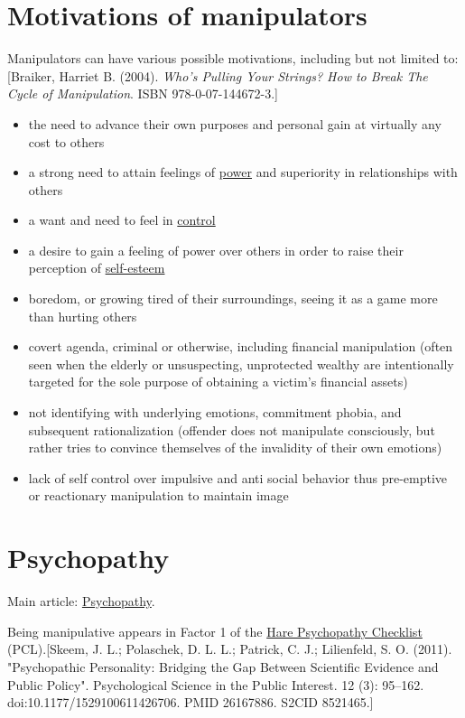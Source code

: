 \documentclass{book}
\numberwithin{equation}{section}
\begin{document}
\section{Motivations of manipulators}
Manipulators can have various possible motivations, including but not limited to:[Braiker, Harriet B. (2004). \textit{Who's Pulling Your Strings? How to Break The Cycle of Manipulation}. ISBN 978-0-07-144672-3.]
\begin{itemize}
    \item the need to advance their own purposes and personal gain at virtually any cost to others
    \item a strong need to attain feelings of \href{https://en.wikipedia.org/wiki/Abusive_power_and_control}{power} and superiority in relationships with others
    \item a want and need to feel in \href{https://en.wikipedia.org/wiki/Abusive_power_and_control}{control}
    \item a desire to gain a feeling of power over others in order to raise their perception of \href{https://en.wikipedia.org/wiki/Self-esteem}{self-esteem}
    \item boredom, or growing tired of their surroundings, seeing it as a game more than hurting others
    \item covert agenda, criminal or otherwise, including financial manipulation (often seen when the elderly or unsuspecting, unprotected wealthy are intentionally targeted for the sole purpose of obtaining a victim's financial assets)
    \item not identifying with underlying emotions, commitment phobia, and subsequent rationalization (offender does not manipulate consciously, but rather tries to convince themselves of the invalidity of their own emotions)
    \item lack of self control over impulsive and anti social behavior thus pre-emptive or reactionary manipulation to maintain image
\end{itemize}

\section{Psychopathy}
Main article: \href{https://en.wikipedia.org/wiki/Psychopathy}{Psychopathy}.

%
Being manipulative appears in Factor 1 of the \href{https://en.wikipedia.org/wiki/Hare_Psychopathy_Checklist}{Hare Psychopathy Checklist} (PCL).[Skeem, J. L.; Polaschek, D. L. L.; Patrick, C. J.; Lilienfeld, S. O. (2011). "Psychopathic Personality: Bridging the Gap Between Scientific Evidence and Public Policy". Psychological Science in the Public Interest. 12 (3): 95--162. doi:10.1177/1529100611426706. PMID 26167886. S2CID 8521465.]
\end{document}

